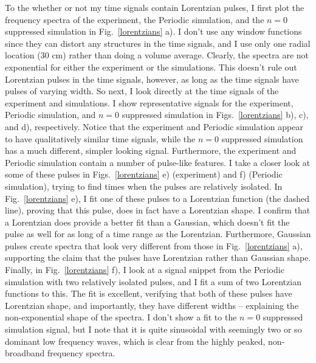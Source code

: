 To the whether or not my time signals contain Lorentzian pulses, I first plot the frequency spectra of the experiment,
the Periodic simulation, and the $n=0$ suppressed simulation in Fig.~\ref{lorentzians} a). I don't use any window functions since they can distort any structures in the time signals,
and I use only one radial location (30 cm) rather than doing a volume average. Clearly, the spectra are not exponential for either the experiment or the simulations. This doesn't rule out
Lorentzian pulses in the time signals, however, as long as the time signals have pulses of varying width. So next, I look directly at the time signals of the experiment and simulations. 
I show representative signals for the experiment, Periodic simulation, and $n=0$ suppressed simulation in Figs.~\ref{lorentzians} b), c), and d), respectively. 
Notice that the experiment and Periodic simulation
appear to have qualitatively similar time signals, while the $n=0$ suppressed simulation has a much different, simpler looking signal. Furthermore, the experiment and Periodic simulation contain
a number of pulse-like features. I take a closer look at some of these pulses in Figs.~\ref{lorentzians} e) (experiment) and f) (Periodic simulation), trying to find times when the pulses
are relatively isolated. In Fig.~\ref{lorentzians} e), I fit one of these pulses to a Lorentzian function (the dashed line), 
proving that this pulse, does in fact have a Lorentzian shape. I confirm that a Lorentzian does provide a better fit than a Gaussian, which doesn't fit the pulse as well for as long of a time
range as the Lorentzian. Furthermore, Gaussian pulses create spectra that look very different from those in Fig.~\ref{lorentzians} a), supporting the claim that the pulses have Lorentzian
rather than Gaussian shape. Finally, in Fig.~\ref{lorentzians} f),
I look at a signal snippet from the Periodic simulation with two relatively isolated pulses, and I fit a sum of two Lorentzian functions to this. The fit is excellent, verifying that
both of these pulses have Lorentzian shape, and importantly, they have different widths -- explaining the non-exponential shape of the spectra. I don't show a fit to the $n=0$ suppressed simulation
signal, but I note that it is quite sinusoidal with seemingly two or so dominant low frequency waves, which is clear from the highly peaked, non-broadband frequency spectra.

